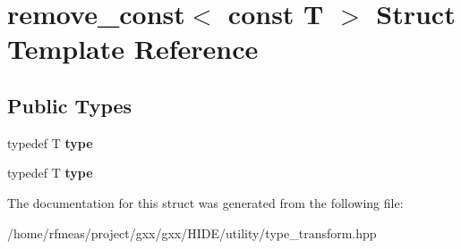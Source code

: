 \hypertarget{structremove__const_3_01const_01T_01_4}{}\section{remove\+\_\+const$<$ const T $>$ Struct Template Reference}
\label{structremove__const_3_01const_01T_01_4}
\subsection*{Public Types}
\begin{DoxyCompactItemize}
\item 
typedef T {\bfseries type}\hypertarget{structremove__const_3_01const_01T_01_4_a4d3920ff9b5818aca708f1d3897937f9}{}\label{structremove__const_3_01const_01T_01_4_a4d3920ff9b5818aca708f1d3897937f9}

\item 
typedef T {\bfseries type}\hypertarget{structremove__const_3_01const_01T_01_4_a4d3920ff9b5818aca708f1d3897937f9}{}\label{structremove__const_3_01const_01T_01_4_a4d3920ff9b5818aca708f1d3897937f9}

\end{DoxyCompactItemize}


The documentation for this struct was generated from the following file\+:\begin{DoxyCompactItemize}
\item 
/home/rfmeas/project/gxx/gxx/\+H\+I\+D\+E/utility/type\+\_\+transform.\+hpp\end{DoxyCompactItemize}
